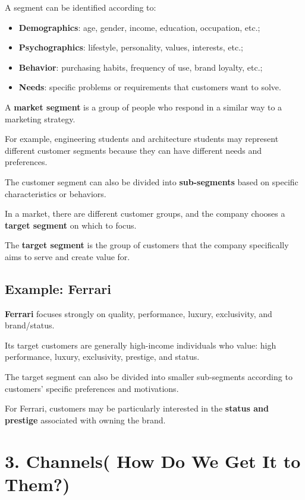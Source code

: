 \documentclass[12pt,a4paper]{report}
\begin{document}
A segment can be identified according to:

\begin{itemize}
    \item \textbf{Demographics}: age, gender, income, education, occupation, etc.;
    \item \textbf{Psychographics}: lifestyle, personality, values, interests, etc.;
    \item \textbf{Behavior}: purchasing habits, frequency of use, brand loyalty, etc.;
    \item \textbf{Needs}: specific problems or requirements that customers want to solve.
\end{itemize}

A \textbf{market segment} is a group of people who respond in a similar way to a marketing strategy.

For example, engineering students and architecture students may represent different customer segments because they can have different needs and preferences.

The customer segment can also be divided into \textbf{sub-segments} based on specific characteristics or behaviors.

In a market, there are different customer groups, and the company chooses a \textbf{target segment} on which to focus.

The \textbf{target segment} is the group of customers that the company specifically aims to serve and create value for.

\subsection{Example: Ferrari}

\textbf{Ferrari} focuses strongly on quality, performance, luxury, exclusivity, and brand/status.

Its target customers are generally high-income individuals who value: high performance, luxury, exclusivity, prestige, and status.

The target segment can also be divided into smaller sub-segments according to customers' specific preferences and motivations.

For Ferrari, customers may be particularly interested in the \textbf{status and prestige} associated with owning the brand.

\section{3. Channels(  How Do We Get It to Them?)}
\end{document}
